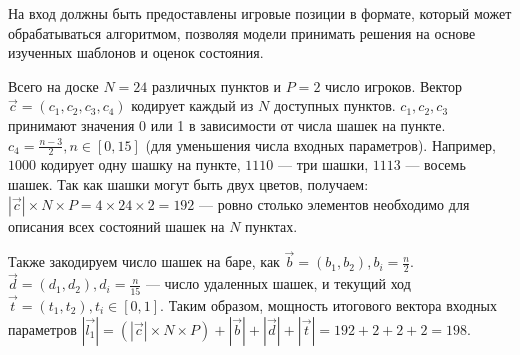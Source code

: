 На вход должны быть предоставлены игровые позиции в формате, который может обрабатываться алгоритмом, позволяя модели принимать решения на основе изученных шаблонов и оценок состояния.

Всего на доске $N = 24$ различных пунктов и $P = 2$ число игроков. Вектор $\vec{c} = (c_1, c_2, c_3, c_4)$ кодирует каждый из $N$ доступных пунктов. $c_1, c_2, c_3$ принимают значения 0 или 1 в зависимости от числа шашек на пункте. $c_4 = \frac{n - 3}{2}, n \in [0, 15]$ (для уменьшения числа входных параметров). Например, $1000$ кодирует одну шашку на пункте, $1110$ — три шашки, $1113$ — восемь шашек. Так как шашки могут быть двух цветов, получаем: $|\vec{c}| \times N \times P = 4 \times 24 \times 2 = 192$ — ровно столько элементов необходимо для описания всех состояний шашек на $N$ пунктах.

Также закодируем число шашек на баре, как $\vec{b} = (b_1, b_2), b_i = \frac{n}{2}$. $\vec{d} = (d_1, d_2),  d_i = \frac{n}{15}$ --- число удаленных шашек, и текущий ход $\vec{t} = (t_1, t_2), t_i \in [0, 1]$. Таким образом, мощность итогового вектора входных параметров $|\vec{l_1}| = (|\vec{c}| \times N \times P) + |\vec{b}| + |\vec{d}| + |\vec{t}| = 192 + 2 + 2 + 2 = 198$.
